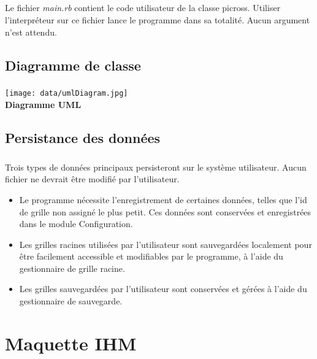         \paragraph*{}
        Le fichier \textit{main.rb} contient le code utilisateur de la classe picross. Utiliser l'interpréteur sur ce fichier lance le programme dans  sa totalité.
	Aucun argument n'est attendu.

\section{Diagramme de classe}
        \paragraph*{}
 
 	\begin{center}
        	\texttt{[image: data/umlDiagram.jpg]}\\
        	\textbf{Diagramme UML}
	\end{center}
        


\section{Persistance des données}
        \paragraph*{}
         Trois types de données principaux persisteront sur le système utilisateur. Aucun fichier ne devrait être modifié par l'utilisateur.
        \begin{itemize}
		\item Le programme nécessite l'enregistrement de certaines données, telles que l'id de grille non assigné le plus petit.
		Ces données sont conservées et enregistrées dans le module Configuration.
		\item Les grilles racines utilisées par l'utilisateur sont sauvegardées localement pour être facilement accessible 
		et modifiables par le programme, à l'aide du gestionnaire de grille racine.
		\item Les grilles sauvegardées par l'utilisateur sont conservées et gérées à l'aide du gestionnaire de sauvegarde.
        \end{itemize}



\chapter{Maquette IHM}



